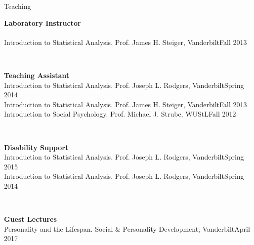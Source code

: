\begin{rSection}{\textrm{Teaching}}
\begin{minipage}{\linewidth}{\large {\bf Laboratory Instructor}\\}
\smallskip\\
Introduction to Statistical Analysis. Prof. James H. Steiger, Vanderbilt\hfill  {Fall 2013}%
\end{minipage}
\medskip\\
\begin{minipage}{\linewidth}{\large {\bf Teaching Assistant}}\\
Introduction to Statistical Analysis. Prof. Joseph L. Rodgers, Vanderbilt\hfill  {Spring 2014}\smallskip\\
Introduction to Statistical Analysis. Prof. James H. Steiger, Vanderbilt\hfill  {Fall 2013}\smallskip\\
Introduction to Social Psychology. Prof. Michael J. Strube, WUStL\hfill{Fall 2012}\end{minipage}\medskip\\
\begin{minipage}{\linewidth}{\large {\bf Disability Support}}\\
Introduction to Statistical Analysis. Prof. Joseph L. Rodgers, Vanderbilt\hfill  {Spring 2015}\smallskip\\
Introduction to Statistical Analysis. Prof. Joseph L. Rodgers, Vanderbilt\hfill{Spring 2014}\end{minipage}\medskip\\
\begin{minipage}{\linewidth}{\large {\bf Guest Lectures}}\\
Personality and the Lifespan. Social \& Personality Development, Vanderbilt\hfill {April 2017}\end{minipage}
\end{rSection}
